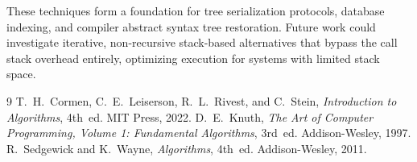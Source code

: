 \documentclass[10pt,journal,compsoc,onecolumn]{IEEEtran}
\begin{document}
These techniques form a foundation for tree serialization protocols, database indexing, and compiler abstract syntax tree restoration. Future work could investigate iterative, non-recursive stack-based alternatives that bypass the call stack overhead entirely, optimizing execution for systems with limited stack space.

\begin{thebibliography}{9}
 T.~H.~Cormen, C.~E.~Leiserson, R.~L.~Rivest, and C.~Stein, \emph{Introduction to Algorithms}, 4th~ed. MIT Press, 2022.
 D.~E.~Knuth, \emph{The Art of Computer Programming, Volume 1: Fundamental Algorithms}, 3rd~ed. Addison-Wesley, 1997.
 R.~Sedgewick and K.~Wayne, \emph{Algorithms}, 4th~ed. Addison-Wesley, 2011.
\end{thebibliography}
\end{document}
